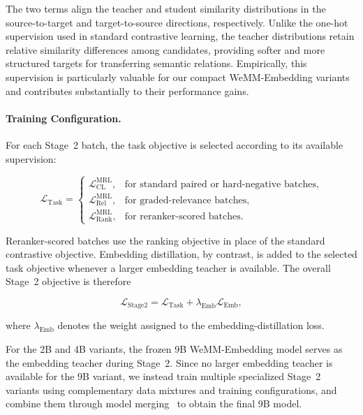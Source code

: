 \documentclass[]{wechat}
\begin{document}
The two terms align the teacher and student similarity distributions in the source-to-target and target-to-source directions, respectively. Unlike the one-hot supervision used in standard contrastive learning, the teacher distributions retain relative similarity differences among candidates, providing softer and more structured targets for transferring semantic relations. Empirically, this supervision is particularly valuable for our compact WeMM-Embedding variants and contributes substantially to their performance gains.

\paragraph{Training Configuration.}

For each Stage~2 batch, the task objective is selected according to its available supervision:

\begin{equation}
    \mathcal{L}_{\mathrm{Task}}
    =
    \begin{cases}
        \mathcal{L}_{\mathrm{CL}}^{\mathrm{MRL}},
        & \text{for standard paired or hard-negative batches}, \\[3pt]
        \mathcal{L}_{\mathrm{Rel}}^{\mathrm{MRL}},
        & \text{for graded-relevance batches}, \\[3pt]
        \mathcal{L}_{\mathrm{Rank}}^{\mathrm{MRL}},
        & \text{for reranker-scored batches}.
    \end{cases}
    \label{eq:stage2_task_objective}
\end{equation}

Reranker-scored batches use the ranking objective in place of the standard contrastive objective. Embedding distillation, by contrast, is added to the selected task objective whenever a larger embedding teacher is available. The overall Stage~2 objective is therefore

\begin{equation}
    \mathcal{L}_{\mathrm{Stage2}}
    =
    \mathcal{L}_{\mathrm{Task}}
    +
    \lambda_{\mathrm{Emb}}
    \mathcal{L}_{\mathrm{Emb}},
    \label{eq:stage2_objective}
\end{equation}

where $\lambda_{\mathrm{Emb}}$ denotes the weight assigned to the embedding-distillation loss.

For the 2B and 4B variants, the frozen 9B WeMM-Embedding model serves as the embedding teacher during Stage~2. Since no larger embedding teacher is available for the 9B variant, we instead train multiple specialized Stage~2 variants using complementary data mixtures and training configurations, and combine them through model merging~\citep{yadav2023ties} to obtain the final 9B model.
\end{document}
